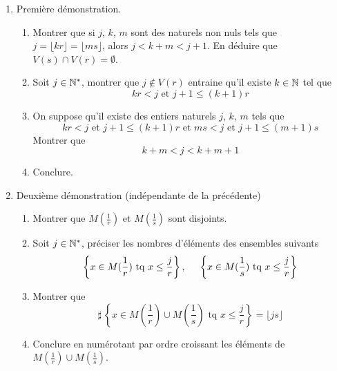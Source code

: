 \begin{enumerate}
 \item Première démonstration.
\begin{enumerate}
 \item Montrer que si $j$, $k$, $m$ sont des naturels non nuls tels que $j=\lfloor kr \rfloor = \lfloor ms\rfloor$, alors $j<k+m<j+1$. En déduire que $V(s)\cap V(r)=\emptyset$.
 \item Soit $j\in \mathbb{N}^*$, montrer que $j\notin V(r)$ entraine qu'il existe $k\in \mathbb{N}$ tel que 
\begin{displaymath}
 kr<j \text{ et } j+1 \leq (k+1)r
\end{displaymath}
 \item On suppose qu'il existe des entiers naturels $j$, $k$, $m$ tels que
\begin{displaymath}
 kr<j \text{ et } j+1 \leq (k+1)r \text{ et } ms<j \text{ et } j+1 \leq (m+1)s
\end{displaymath}
Montrer que 
\begin{displaymath}
 k+m < j < k+m+1
\end{displaymath}
\item Conclure.
\end{enumerate}

 \item Deuxième démonstration (indépendante de la précédente) 
\begin{enumerate}
\item Montrer que $M(\frac{1}{r})$ et $M(\frac{1}{s})$ sont disjoints.
\item Soit $j\in \mathbb{N}^*$, préciser les nombres d'éléments des ensembles suivants
\begin{displaymath}
\left\lbrace x\in M(\frac{1}{r})\text{ tq } x\leq \frac{j}{r} \right\rbrace,\hspace{0.5cm}
\left\lbrace x\in M(\frac{1}{s})\text{ tq } x\leq \frac{j}{r} \right\rbrace
\end{displaymath}
\item Montrer que
\begin{displaymath}
 \sharp\,\left\lbrace x\in M(\frac{1}{r})\cup M(\frac{1}{s})\text{ tq } x\leq \frac{j}{r} \right\rbrace 
= \lfloor js \rfloor
\end{displaymath}
\item Conclure en numérotant par ordre croissant les éléments de $M(\frac{1}{r})\cup M(\frac{1}{s})$.
\end{enumerate}
\end{enumerate}

